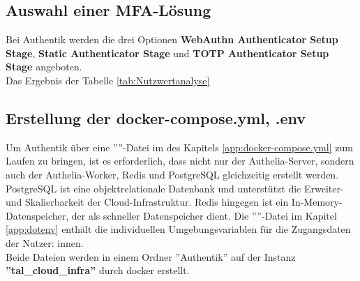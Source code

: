 \subsection{Auswahl einer MFA-Lösung}
\label{sec:Auswahl einer MFA-Lösung}
Bei Authentik werden die drei Optionen \textbf{WebAuthn Authenticator Setup Stage}, \textbf{Static Authenticator Stage} und 
\textbf{\acs{TOTP} Authenticator Setup Stage} angeboten. 
\\ Das Ergebnis der Tabelle \ref*{tab:Nutzwertanalyse}  


\subsection{Erstellung der docker-compose.yml, .env}
\label{sec:Erstellung der docker-compose.yml, .env}
Um Authentik über eine ''''-Datei im  des Kapitels \ref{app:docker-compose.yml} 
zum Laufen zu bringen, ist es erforderlich, dass nicht nur der Authelia-Server, sondern auch der Authelia-Worker, 
Redis und PostgreSQL gleichzeitig erstellt werden. PostgreSQL ist eine objektrelationale Datenbank und unterstützt 
die Erweiter- und Skalierbarkeit der Cloud-Infrastruktur. Redis hingegen ist ein In-Memory-Datenspeicher, der als 
schneller Datenspeicher dient. Die ''''-Datei im Kapitel \ref{app:dotenv}  
enthält die individuellen Umgebungsvariablen für die Zugangsdaten der Nutzer: innen. 
\\Beide Dateien werden in einem Ordner ''Authentik'' auf der Instanz \textbf{''tal\_cloud\_infra''} durch docker erstellt.

